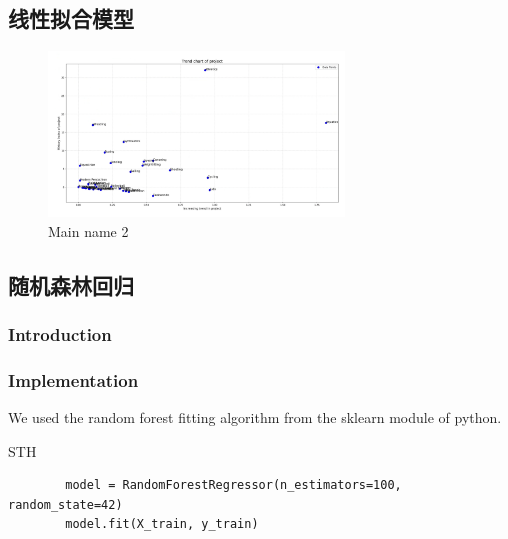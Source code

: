 \documentclass[a4paper]{article}
\begin{document}
\subsection{线性拟合模型}
\captionsetup[listing]{labelformat=empty}
\begin{figure}[H] %
    \centering %
    \includegraphics[width=0.7\textwidth]{TrendChartOfProject} %
    \caption{Main name 2} %
    \label{Fig.main2} %
    \end{figure}

\subsection{随机森林回归}
\subsubsection{Introduction}


\subsubsection{Implementation}
We used the random forest fitting algorithm from the sklearn module of python.
\begin{listing}[htb]\caption{STH}\label{code:processdweet}
    \begin{verbatim}
        model = RandomForestRegressor(n_estimators=100, random_state=42)
        model.fit(X_train, y_train)
\end{verbatim} 
\end{listing}
\end{document}
